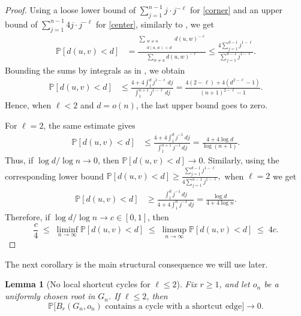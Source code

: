 \documentclass[10pt]{amsart}
\newtheorem{lemma}[theorem]{Lemma}
\begin{document}
\begin{proof}
Using a loose lower bound of $\sum_{j=1}^{n-1} j\cdot j^{-\ell}$ for \eqref{corner} and an upper bound of $\sum_{j=1}^{n-1} 4j\cdot j^{-\ell}$ for \eqref{center}, similarly to \cite{kleinberg}, we get
\begin{align*}
    \mathbb P[d(u,v)<d]
    &= \frac{\sum_{\substack{w\neq u\\ d(u,w)<d}} d(u,w)^{-\ell}}
    {\sum_{w\neq u} d(u,w)^{-\ell}}
    \le \frac{4\sum_{j=1}^{d-1} j^{1-\ell}}{\sum_{j=1}^{n-1} j^{1-\ell}}.
\end{align*}
Bounding the sums by integrals as in \cite{kleinberg}, we obtain
\begin{align*}
    \mathbb P[d(u,v)<d]
    &\le \frac{4+4\int_1^{d} j^{1-\ell}\,dj}{\int_1^{n+1} j^{1-\ell}\,dj}
    = \frac{4(2-\ell)+4(d^{2-\ell}-1)}{(n+1)^{2-\ell}-1}.
\end{align*}
Hence, when $\ell<2$ and $d=o(n)$, the last upper bound goes to zero.

For $\ell=2$, the same estimate gives
\begin{align*}
    \mathbb P[d(u,v)<d]
    &\le \frac{4+4\int_1^{d} j^{-1}\,dj}{\int_1^{n+1} j^{-1}\,dj}
    = \frac{4+4\log d}{\log(n+1)}.
\end{align*}
Thus, if $\log d/\log n\to 0$, then $\mathbb P[d(u,v)<d]\to 0$.
Similarly, using the corresponding lower bound
\(
\mathbb P[d(u,v)<d]
\ge
\frac{\sum_{j=1}^{d-1} j^{1-\ell}}{4\sum_{j=1}^{n-1} j^{1-\ell}},
\)
when $\ell=2$ we get
\begin{align*}
    \mathbb P[d(u,v)<d]
    &\ge \frac{\int_1^{d} j^{-1}\,dj}{4+4\int_1^n j^{-1}\,dj}
    = \frac{\log d}{4+4\log n}.
\end{align*}
Therefore, if $\log d/\log n\to c\in[0,1]$, then
\[
\frac{c}{4}
\;\le\;
\liminf_{n\to\infty}\mathbb P[d(u,v)<d]
\;\le\;
\limsup_{n\to\infty}\mathbb P[d(u,v)<d]
\;\le\;
4c.
\]
\end{proof}

The next corollary is the main structural consequence we will use later.

\begin{lemma}[No local shortcut cycles for $\ell\le 2$]\label{lem:no-local-shortcut-cycle}
Fix $r\ge 1$, and let $o_n$ be a uniformly chosen root in $G_n$. If $\ell\le 2$, then
\[
\mathbb P\bigl[B_r(G_n,o_n)\text{ contains a cycle with a shortcut edge}\bigr]\to 0.
\]
\end{lemma}
\end{document}
